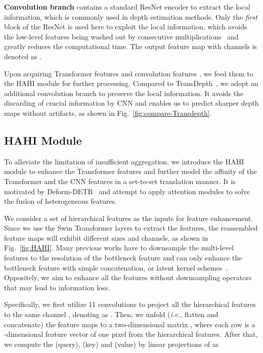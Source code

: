 \documentclass[twocolumn]{svjour3}    \pdfoutput=1
\begin{document}
\textbf{Convolution branch} contains a standard ResNet encoder to extract the local information, which is commonly used in depth estimation methods. Only the \textit{first} block of the ResNet is used here to exploit the local information, which avoids the low-level features being washed out by consecutive multiplications~\citep{yang2021transdepth} and greatly reduces the computational time. The output feature map with  channels is denoted as .

Upon acquiring Transformer features  and convolution features , we feed them to the HAHI module for further processing. Compared to TransDepth~\citep{yang2021transdepth}, we adopt an additional convolution branch to preserve the local information. It avoids the discarding of crucial information by CNN and enables us to predict sharper depth maps without artifacts, as shown in Fig.~\ref{fig:compare-Transdepth}.

\subsection{HAHI Module}
\label{sec:subsec:HAHI}

To alleviate the limitation of insufficient aggregation, we introduce the HAHI module to enhance the Transformer features and further model the affinity of the Transformer and the CNN features in a set-to-set translation manner. It is motivated by Deform-DETR~\cite{zhu2020deformabledetr} and attempt to apply attention modules to solve the fusion of heterogeneous features.

We consider a set of hierarchical features  as the inputs for feature enhancement. Since we use the Swin Transformer layers to extract the features, the reassembled feature maps will exhibit different sizes and channels, as shown in Fig.~\ref{fig:HAHI}. Many previous works have to downsample the multi-level features to the resolution of the bottleneck feature and can only enhance the bottleneck feature with simple concatenation, or latent kernel schemes~\citep{yang2021transdepth, zheng2021setr, lee2019bts}. Oppositely, we aim to enhance all the features without downsampling operators that may lead to information loss.

Specifically, we first utilize 11 convolutions to project all the hierarchical features to the same channel , denoting as . Then, we unfold (\textit{i.e.}, flatten and concatenate) the feature maps to a two-dimensional matrix , where each row is a -dimensional feature vector of one pixel from the hierarchical features. After that, we compute the  (query),  (key) and  (value) by linear projections of  as
\end{document}
